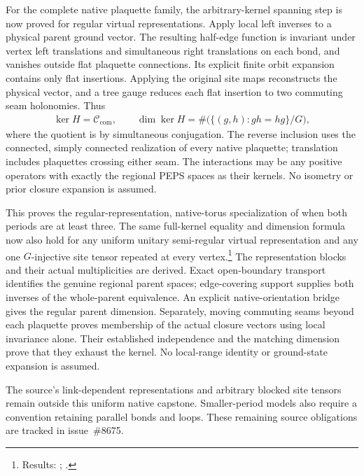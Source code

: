 \documentclass{article}
\begin{document}
For the complete native plaquette family, the arbitrary-kernel spanning
step is now proved for regular virtual representations. Apply local left
inverses to a physical parent ground vector. The resulting half-edge
function is invariant under vertex left translations and simultaneous
right translations on each bond, and vanishes outside flat plaquette
connections. Its explicit finite orbit expansion contains only flat
insertions. Applying the original site maps reconstructs the physical
vector, and a tree gauge reduces each flat insertion to two commuting
seam holonomies. Thus
\begin{align}
    \ker H=\mathcal C_{\mathrm{com}},\qquad
    \dim\ker H=\#\bigl(\{(g,h):gh=hg\}/G\bigr),
\end{align}
where the quotient is by simultaneous conjugation. The reverse inclusion
uses the connected, simply connected realization of every native
plaquette; translation includes plaquettes crossing either seam.
The interactions may be any positive operators with exactly the regional
PEPS spaces as their kernels. No isometry or prior closure expansion is
assumed.

This proves the regular-representation, native-torus specialization of
\cite[Theorems~5.7 and~5.9]{Schuch2010PEPS} when both periods are at least
three. The same full-kernel equality and dimension formula now also hold
for any uniform unitary semi-regular virtual representation and any one
$G$-injective site tensor repeated at every vertex.\footnote{Results:
    ;
    .}
The representation blocks and their actual multiplicities are derived.
Exact open-boundary transport identifies the genuine regional parent spaces;
edge-covering support supplies both inverses of the whole-parent equivalence.
An explicit native-orientation bridge gives the regular parent dimension.
Separately, moving commuting seams beyond each plaquette proves membership
of the actual closure vectors using local invariance alone. Their established
independence and the matching dimension prove that they exhaust the kernel.
No local-range identity or ground-state expansion is assumed.

The source's link-dependent representations and arbitrary blocked site tensors
remain outside this uniform native capstone. Smaller-period models also require
a convention retaining parallel bonds and loops. These remaining source
obligations are tracked in issue~\#8675.
\end{document}
